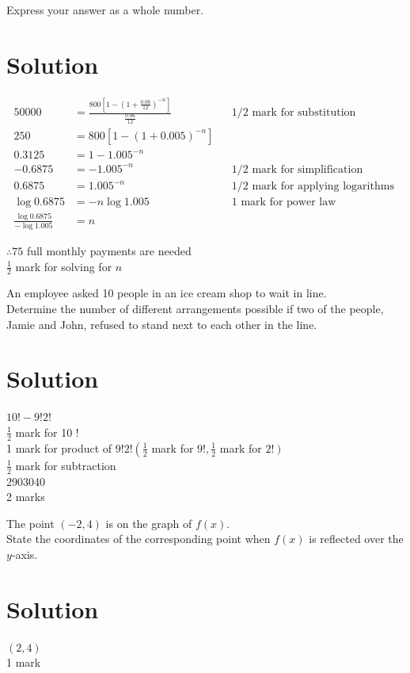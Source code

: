 \documentclass[10pt]{article}
\begin{document}
Express your answer as a whole number.

\section*{Solution}
$$
\begin{aligned}
50000 & =\frac{800\left[1-\left(1+\frac{0.06}{12}\right)^{-n}\right]}{\frac{0.06}{12}} & & 1 / 2 \text { mark for substitution } \\
250 & =800\left[1-(1+0.005)^{-n}\right] & & \\
0.3125 & =1-1.005^{-n} & & \\
-0.6875 & =-1.005^{-n} & & 1 / 2 \text { mark for simplification } \\
0.6875 & =1.005^{-n} & & 1 / 2 \text { mark for applying logarithms } \\
\log 0.6875 & =-n \log 1.005 & & 1 \text { mark for power law } \\
\frac{\log 0.6875}{-\log 1.005} & =n & &
\end{aligned}
$$

$\therefore 75$ full monthly payments are needed\\
$\frac{1}{2}$ mark for solving for $n$

An employee asked 10 people in an ice cream shop to wait in line.\\
Determine the number of different arrangements possible if two of the people, Jamie and John, refused to stand next to each other in the line.

\section*{Solution}
$10!-9!2!$\\
$\frac{1}{2}$ mark for 10 !\\
1 mark for product of $9!2!\left(\frac{1}{2}\right.$ mark for $9!, \frac{1}{2}$ mark for $\left.2!\right)$\\
$\frac{1}{2}$ mark for subtraction\\
2903040\\
2 marks

The point $(-2,4)$ is on the graph of $f(x)$.\\
State the coordinates of the corresponding point when $f(x)$ is reflected over the $y$-axis.

\section*{Solution}
$(2,4)$\\
1 mark
\end{document}

